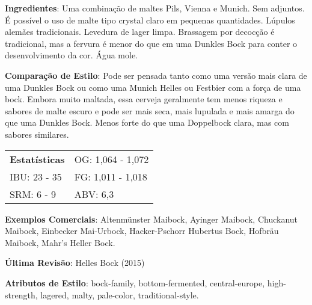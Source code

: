\textbf{Ingredientes}: Uma combinação de maltes Pils, Vienna e Munich. Sem adjuntos. É possível o uso de malte tipo crystal claro em pequenas quantidades. Lúpulos alemães tradicionais. Levedura de lager limpa. Brassagem por decocção é tradicional, mas a fervura é menor do que em uma Dunkles Bock para conter o desenvolvimento da cor. Água mole.

\textbf{Comparação de Estilo}: Pode ser pensada tanto como uma versão mais clara de uma Dunkles Bock ou como uma Munich Helles ou Festbier com a força de uma bock. Embora muito maltada, essa cerveja geralmente tem menos riqueza e sabores de malte escuro e pode ser mais seca, mais lupulada e mais amarga do que uma Dunkles Bock. Menos forte do que uma Doppelbock clara, mas com sabores similares.

\begin{tabular}{@{}p{35mm}p{35mm}@{}}
  \textbf{Estatísticas} & OG: 1,064 - 1,072 \\
  IBU: 23 - 35  & FG: 1,011 - 1,018  \\
  SRM: 6 - 9  & ABV: 6,3%
\end{tabular}

\textbf{Exemplos Comerciais}: Altenmünster Maibock, Ayinger Maibock, Chuckanut Maibock, Einbecker Mai-Urbock, Hacker-Pschorr Hubertus Bock, Hofbräu Maibock, Mahr’s Heller Bock.

\textbf{Última Revisão}: Helles Bock (2015)

\textbf{Atributos de Estilo}: bock-family, bottom-fermented, central-europe, high-strength, lagered, malty, pale-color, traditional-style.
